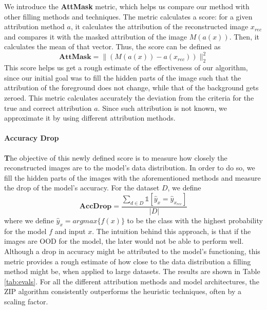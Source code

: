 We introduce the \textbf{AttMask} metric, which helps us compare our method with other filling methods and techniques. The metric calculates a score: for a given attribution method $a$, it calculates the attribution of the reconstructed image $x_{rec}$ and compares it with the masked attribution of the image $M(a(x))$. Then, it calculates the mean of that vector. Thus, the score can be defined as 
\begin{equation}
    \textbf{AttMask} = \|(M(a(x)) - a(x_{rec}))\|^2_2
    \label{eq:attmask}
\end{equation}
This score helps us get a rough estimate of the effectiveness of our algorithm, since our initial goal was to fill the hidden parts of the image such that the attribution of the foreground does not change, while that of the background gets zeroed. This metric calculates accurately the deviation from the criteria for the true and correct attribution $a$. Since such attribution is not known, we approximate it by using different attribution methods.


\paragraph{Accuracy Drop}

\textbf The objective of this newly defined score is to measure how closely the reconstructed images are to the model's data distribution. In order to do so, we fill the hidden parts of the images with the aforementioned methods and measure the drop of the model's accuracy. For the dataset $D$, we define
\begin{equation}
    \textbf{AccDrop} = \frac{\sum_{d \in D} \mathds{1}[\hat{y}_{x}=\hat{y}_{x_{rec}}]}{|D|} 
\end{equation} where we define $\hat{y}_x=argmax\{f(x)\}$ to be the class with the highest probability for the model $f$ and input $x$. The intuition behind this approach, is that if the images are OOD for the model, the later would not be able to perform well. Although a drop in accuracy might be attributed to the model's functioning, this metric provides a rough estimate of how close to the data distribution a filling method might be, when applied to large datasets. The results are shown in Table \autoref{tab:evals}. For all the different attribution methods and model architectures, the ZIP algorithm consistently outperforms the heuristic techniques, often by a scaling factor.

